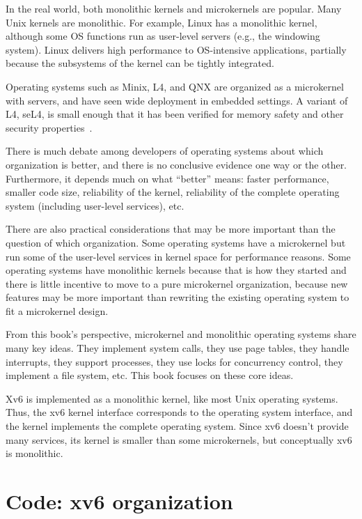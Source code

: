 In the real world, both monolithic kernels and microkernels are
popular. Many
Unix kernels are monolithic. For example, Linux has a monolithic kernel,
although some OS functions run as user-level servers (e.g., the windowing
system).  Linux delivers high performance to OS-intensive applications, partially
because the subsystems of the kernel can be tightly integrated.

Operating systems such as Minix, L4, and QNX are organized as a microkernel with
servers, and have seen wide deployment in embedded settings.  A
variant of L4, seL4, is small enough that it has been verified for
memory safety and other security properties~\cite{sel4}.

There is much debate among developers of operating systems about which
organization is better, and there is no conclusive evidence one way or
the other.  Furthermore, it depends much on what ``better'' means:
faster performance, smaller code size, reliability of the kernel,
reliability of the complete operating system (including user-level
services), etc.

There are also practical considerations that may be more important
than the question of which organization.  Some operating systems
have a microkernel but run some of the user-level services in kernel
space for performance reasons.  Some operating systems have monolithic
kernels because that is how they started and there is little incentive
to move to a pure microkernel organization, because new features may
be more important than rewriting the existing operating system to fit a microkernel
design.

From this book's perspective, microkernel and monolithic operating
systems share many key ideas.  They implement system calls, they use
page tables, they handle interrupts, they support processes, they use
locks for concurrency control, they implement a file system,
etc. This book focuses on these core ideas.

Xv6 is
implemented as a monolithic kernel, like most Unix operating systems.
Thus, the xv6 kernel interface corresponds to the operating system
interface, and the kernel implements the complete operating system.  Since 
xv6 doesn't provide many services, its kernel is smaller than some
microkernels, but conceptually xv6 is monolithic.  

\section{Code: xv6 organization}

